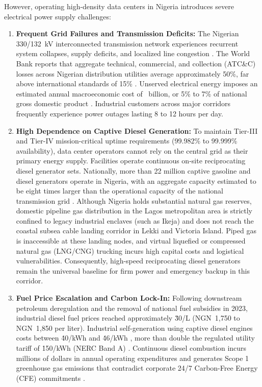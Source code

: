 \documentclass[11pt,a4paper]{article}
\begin{document}
However, operating high-density data centers in Nigeria introduces severe electrical power supply challenges:
\begin{enumerate}
    \item \textbf{Frequent Grid Failures and Transmission Deficits:} The Nigerian 330/132~kV interconnected transmission network experiences recurrent system collapses, supply deficits, and localized line congestion \cite{Arowolo2022}. The World Bank reports that aggregate technical, commercial, and collection (ATC\&C) losses across Nigerian distribution utilities average approximately 50\%, far above international standards of 15\% \cite{WorldBank2020}. Unserved electrical energy imposes an estimated annual macroeconomic cost of \ billion, or 5\% to 7\% of national gross domestic product \cite{WorldBank2020}. Industrial customers across major corridors frequently experience power outages lasting 8 to 12 hours per day.
    \item \textbf{High Dependence on Captive Diesel Generation:} To maintain Tier-III and Tier-IV mission-critical uptime requirements (99.982\% to 99.999\% availability), data center operators cannot rely on the central grid as their primary energy supply. Facilities operate continuous on-site reciprocating diesel generator sets. Nationally, more than 22 million captive gasoline and diesel generators operate in Nigeria, with an aggregate capacity estimated to be eight times larger than the operational capacity of the national transmission grid \cite{WorldBank2020, Oseni2012}. Although Nigeria holds substantial natural gas reserves, domestic pipeline gas distribution in the Lagos metropolitan area is strictly confined to legacy industrial enclaves (such as Ikeja) and does not reach the coastal subsea cable landing corridor in Lekki and Victoria Island. Piped gas is inaccessible at these landing nodes, and virtual liquefied or compressed natural gas (LNG/CNG) trucking incurs high capital costs and logistical vulnerabilities. Consequently, high-speed reciprocating diesel generators remain the universal baseline for firm power and emergency backup in this corridor.
    \item \textbf{Fuel Price Escalation and Carbon Lock-In:} Following downstream petroleum deregulation and the removal of national fuel subsidies in 2023, industrial diesel fuel prices reached approximately \.30/L (NGN~1,750 to NGN~1,850 per liter). Industrial self-generation using captive diesel engines costs between \.40/kWh and \.46/kWh \cite{WorldBank2020}, more than double the regulated utility tariff of \.150/kWh (NERC Band A) \cite{NERC2024}. Continuous diesel combustion incurs millions of dollars in annual operating expenditures and generates Scope 1 greenhouse gas emissions that contradict corporate 24/7 Carbon-Free Energy (CFE) commitments \cite{Xu2024}.
\end{enumerate}
\end{document}
